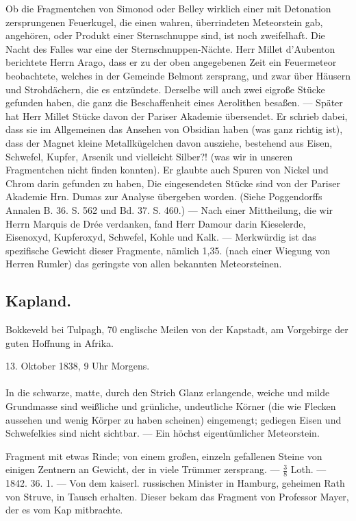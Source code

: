 \documentclass[a4paper, 11pt, oneside, polutonikogreek, german]{article}
\begin{document}
Ob die Fragmentchen von Simonod oder Belley wirklich einer mit Detonation zersprungenen Feuerkugel, die einen wahren, überrindeten Meteorstein gab, angehören, oder Produkt einer Sternschnuppe sind, ist noch zweifelhaft. Die Nacht des Falles war eine der Sternschnuppen-Nächte. Herr Millet d’Aubenton berichtete Herrn Arago, dass er zu der oben angegebenen Zeit ein Feuermeteor beobachtete, welches in der Gemeinde Belmont zersprang, und zwar über Häusern und Strohdächern, die es entzündete. Derselbe will auch zwei eigroße Stücke gefunden haben, die ganz die Beschaffenheit eines Aerolithen besaßen. — Später hat Herr Millet Stücke davon der Pariser Akademie übersendet. Er schrieb dabei, dass sie im Allgemeinen das Ansehen von Obsidian haben (was ganz richtig ist), dass der Magnet kleine Metallkügelchen davon ausziehe, bestehend aus Eisen, Schwefel, Kupfer, Arsenik und vielleicht Silber?! (was wir in unseren Fragmentchen nicht finden konnten). Er glaubte auch Spuren von Nickel und Chrom darin gefunden zu haben, Die eingesendeten Stücke sind von der Pariser Akademie Hrn. Dumas zur Analyse übergeben worden. (Siehe Poggendorffs Annalen B. 36. S. 562 und Bd. 37. S. 460.) — Nach einer Mittheilung, die wir Herrn Marquis de Drée verdanken, fand Herr Damour darin Kieselerde, Eisenoxyd, Kupferoxyd, Schwefel, Kohle und Kalk. — Merkwürdig ist das spezifische Gewicht dieser Fragmente‚ nämlich 1,35. (nach einer Wiegung von Herren Rumler) das geringste von allen bekannten Meteorsteinen.
\subsection{Kapland.}
\begin{center}
\small
Bokkeveld bei Tulpagh, 70 englische Meilen von der Kapstadt, am Vorgebirge der guten Hoffnung in Afrika.

13. Oktober 1838, 9 Uhr Morgens.
\end{center}
\paragraph{}
In die schwarze, matte, durch den Strich Glanz erlangende, weiche und milde Grundmasse sind weißliche und grünliche, undeutliche Körner (die wie Flecken aussehen und wenig Körper zu haben scheinen) eingemengt; gediegen Eisen und Schwefelkies sind nicht sichtbar. — Ein höchst eigentümlicher Meteorstein.

Fragment mit etwas Rinde; von einem großen, einzeln gefallenen Steine von einigen Zentnern an Gewicht, der in viele Trümmer zersprang. — $\frac{3}{8}$ Loth. — 1842. 36. 1. — Von dem kaiserl. russischen Minister in Hamburg, geheimen Rath von Struve, in Tausch erhalten. Dieser bekam das Fragment von Professor Mayer, der es vom Kap mitbrachte.
\end{document}
